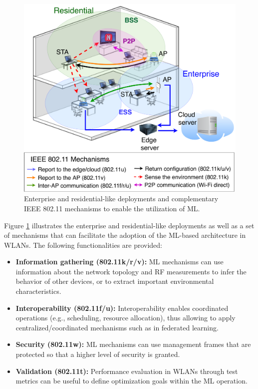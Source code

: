 \documentclass{article}
\begin{document}
\begin{figure}[ht!]
	\centering
	\includegraphics[width=.8\columnwidth]{overview_learning_approaches}
	\caption{Enterprise and residential-like deployments and complementary IEEE 802.11 mechanisms to enable the utilization of ML.}
	\label{fig:overview_learning_approaches}
\end{figure}

Figure \ref{fig:overview_learning_approaches} illustrates the enterprise and residential-like deployments as well as a set of mechanisms that can facilitate the adoption of the ML-based architecture in WLANs. The following functionalities are provided:
\begin{itemize}
	\item \textbf{Information gathering (802.11k/r/v):} ML mechanisms can use information about the network topology and RF measurements to infer the behavior of other devices, or to extract important environmental characteristics.
	\item \textbf{Interoperability (802.11f/u):} Interoperability enables coordinated operations (e.g., scheduling, resource allocation), thus allowing to apply centralized/coordinated mechanisms such as in federated learning.
	\item \textbf{Security (802.11w):} ML mechanisms can use management frames that are protected so that a higher level of security is granted.
	\item \textbf{Validation (802.11t):} Performance evaluation in WLANs through test metrics can be useful to define optimization goals within the ML  operation.
\end{itemize}
\end{document}
